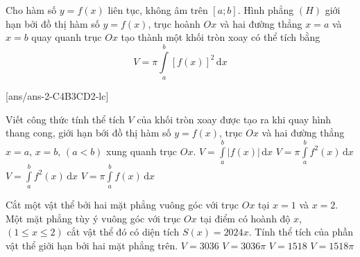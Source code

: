 \begin{tomtat}
\begin{center}
	\end{center}
	Cho hàm số $y=f(x)$ liên tục, không âm trên $\left[a ; b\right]$. Hình phẳng $(H)$ giới hạn bởi đồ thị hàm số $y=f(x)$, trục hoành $O x$ và hai đường thẳng $x=a$ và $x=b$ quay quanh trục $O x$ tạo thành một khối tròn xoay có thể tích bằng
	$$
	V=\pi \displaystyle\int\limits_a^b\left[f(x)\right]^2 \mathrm{\,d} x
	$$
\end{tomtat}
\TN
{}[ans/ans-2-C4B3CD2-lc]
\begin{ex}%
Viết công thức tính thể tích $V$ của khối tròn xoay được tạo ra khi quay hình thang cong, giới hạn bới đồ thị hàm số $y=f(x)$, trục $O x$ và hai đường thẳng $x=a$, $x=b$, $(a<b)$ xung quanh trục $O x$.
\choice
{$V=\displaystyle\int\limits_a^b \left|f(x)\right| \mathrm{\,d} x$}
{\True $V=\pi \displaystyle\int\limits_a^b f^2(x) \mathrm{\,d} x $}
{$V=\displaystyle\int\limits_a^b f^2(x) \mathrm{\,d} x$}
{$V=\pi \displaystyle\int\limits_a^b f(x) \mathrm{\,d} x$}
\end{ex}
\begin{ex}%
	Cắt một vật thể bởi hai mặt phẳng vuông góc với trục $O x$ tại $x=1$ và $x=2$. Một mặt phẳng tùy ý vuông góc với trục $O x$ tại điểm có hoành độ $x$, $(1 \leq x \leq 2)$ cắt vật thể đó có diện tích $S(x)=2024 x$. Tính thể tích của phần vật thể giới hạn bởi hai mặt phẳng trên.
	\choice
	{\True $V=3036$}
	{$V=3036 \pi$}
	{$V=1518$}
	{$V=1518 \pi$}
\end{ex}

